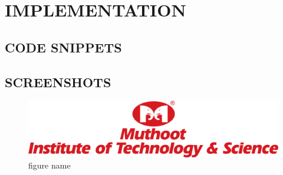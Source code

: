 \chapter{IMPLEMENTATION}

\section{CODE SNIPPETS}
\noindent



\newpage

\section{SCREENSHOTS}



\begin{figure}[hbtp]
    \centering
    \includegraphics{images/MITS.png}
    \caption{figure name}
    \label{fig1}
\end{figure}
